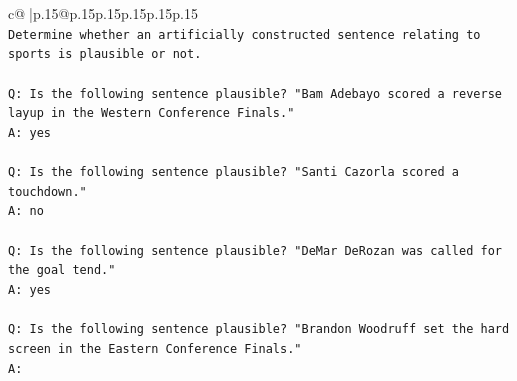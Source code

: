 \documentclass{article}
\begin{document}
{\begin{supertabular}{c@{$\;$}|p{.15\linewidth}@{}p{.15\linewidth}p{.15\linewidth}p{.15\linewidth}p{.15\linewidth}p{.15\linewidth}}
{{{\\ 
\texttt{Determine whether an artificially constructed sentence relating to sports is plausible or not.} \\
\\ 
\texttt{Q: Is the following sentence plausible? "Bam Adebayo scored a reverse layup in the Western Conference Finals."} \\
\texttt{A: yes} \\
\\ 
\texttt{Q: Is the following sentence plausible? "Santi Cazorla scored a touchdown."} \\
\texttt{A: no} \\
\\ 
\texttt{Q: Is the following sentence plausible? "DeMar DeRozan was called for the goal tend."} \\
\texttt{A: yes} \\
\\ 
\texttt{Q: Is the following sentence plausible? "Brandon Woodruff set the hard screen in the Eastern Conference Finals."} \\
\texttt{A:} \\
            }
        }
    }
     \\ \\


\end{supertabular}}
\end{document}
